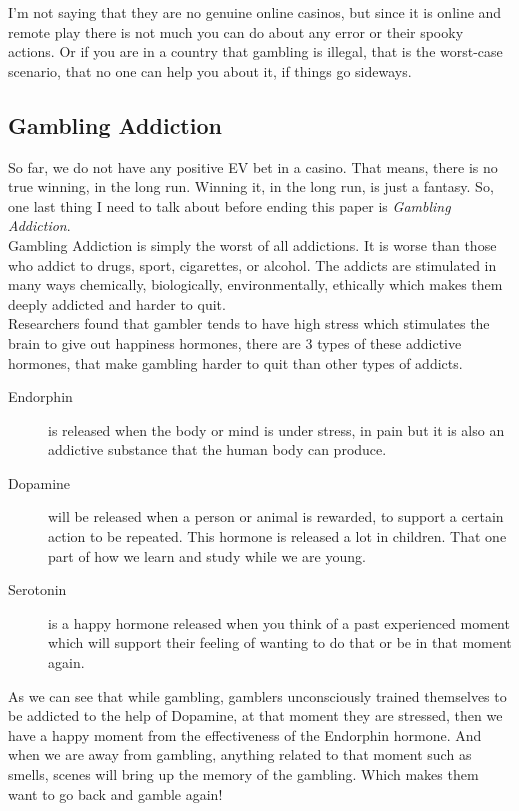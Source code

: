 \documentclass{article}
\begin{document}
I'm not saying that they are no genuine online casinos, but since it is online and remote play there is not much you can do about any error or their spooky actions.  Or if you are in a country that gambling is illegal, that is the worst-case scenario, that no one can help you about it, if things go sideways.\\


\subsection{Gambling Addiction}
So far, we do not have any positive EV bet in a casino.  That means, there is no true winning, in the long run.  Winning it, in the long run, is just a fantasy.  So, one last thing I need to talk about before ending this paper is \emph{Gambling Addiction}.\\

Gambling Addiction is simply the worst of all addictions.  It is worse than those who addict to drugs, sport, cigarettes, or alcohol.  The addicts are stimulated in many ways chemically, biologically, environmentally, ethically which makes them deeply addicted and harder to quit.\\

Researchers found that gambler tends to have high stress which stimulates the brain to give out happiness hormones, there are 3 types of these addictive hormones, that make gambling harder to quit than other types of addicts.  \\
\begin{description}
\item[Endorphin] is released when the body or mind is under stress, in pain but it is also an addictive substance that the human body can produce.    
\item[Dopamine] will be released when a person or animal is rewarded, to support a certain action to be repeated.  This hormone is released a lot in children.  That one part of how we learn and study while we are young.
\item[Serotonin] is a happy hormone released when you think of a past experienced moment which will support their feeling of wanting to do that or be in that moment again. 
\end{description}

As we can see that while gambling, gamblers unconsciously trained themselves to be addicted to the help of Dopamine, at that moment they are stressed, then we have a happy moment from the effectiveness of the Endorphin hormone. And when we are away from gambling, anything related to that moment such as smells, scenes will bring up the memory of the gambling.  Which makes them want to go back and gamble again!\\
\end{document}
